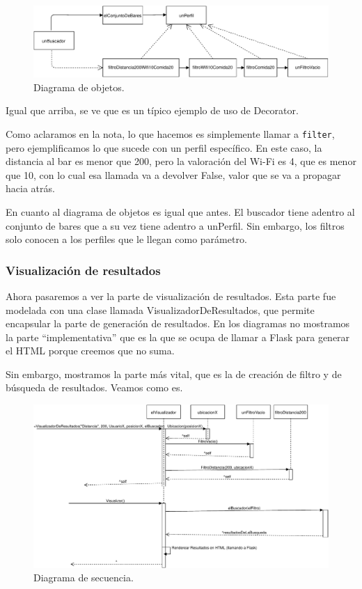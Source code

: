 \begin{figure}[H]
  \centering
  \includegraphics[width=\textwidth]{diagramas/objetos_3.pdf}
  \caption{\normalfont Diagrama de objetos.}
\end{figure}


Igual que arriba, se ve que es un típico ejemplo de uso de Decorator.

Como aclaramos en la nota, lo que hacemos es simplemente llamar a \texttt{filter}, pero ejemplificamos lo que sucede con un perfil específico. En este caso, la distancia al bar es menor que 200, pero la valoración del Wi-Fi es 4, que es menor que 10, con lo cual esa llamada va a devolver False, valor que se va a propagar hacia atrás.

En cuanto al diagrama de objetos es igual que antes. El buscador tiene adentro al conjunto de bares que a su vez tiene adentro a unPerfil. Sin embargo, los filtros solo conocen a los perfiles que le llegan como parámetro.

\subsubsection{Visualización de resultados}

Ahora pasaremos a ver la parte de visualización de resultados. Esta parte fue modelada con una clase llamada VisualizadorDeResultados, que permite encapsular la parte de generación de resultados. En los diagramas no mostramos la parte ``implementativa'' que es la que se ocupa de llamar a Flask para generar el HTML porque creemos que no suma.

Sin embargo, mostramos la parte más vital, que es la de creación de filtro y de búsqueda de resultados. Veamos como es.

\begin{figure}[H]
  \centering
  \includegraphics[width=\textwidth]{diagramas/secuencia_4.pdf}
  \caption{\normalfont Diagrama de secuencia.}
\end{figure}

